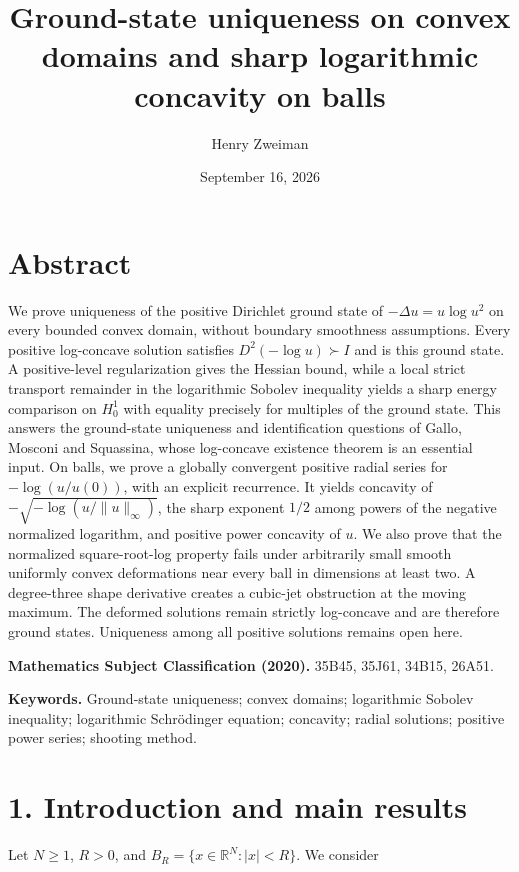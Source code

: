 \documentclass[11pt]{article}
\title{Ground-state uniqueness on convex domains and sharp logarithmic concavity on balls}
\author{Henry Zweiman}
\date{September 16, 2026}
\begin{document}
\maketitle
{}\section{Abstract}\label{abstract}

We prove uniqueness of the positive Dirichlet ground state of
\(-\Delta u=u\log u^2\) on every bounded convex domain, without boundary
smoothness assumptions. Every positive log-concave solution satisfies
\(D^2(-\log u)\succ I\) and is this ground state. A positive-level
regularization gives the Hessian bound, while a local strict transport
remainder in the logarithmic Sobolev inequality yields a sharp energy
comparison on \(H^1_0\) with equality precisely for multiples of the
ground state. This answers the ground-state uniqueness and
identification questions of Gallo, Mosconi and Squassina, whose
log-concave existence theorem is an essential input. On balls, we prove
a globally convergent positive radial series for \(-\log(u/u(0))\), with
an explicit recurrence. It yields concavity of
\(-\sqrt{-\log(u/\|u\|_\infty)}\), the sharp exponent \(1/2\) among
powers of the negative normalized logarithm, and positive power
concavity of \(u\). We also prove that the normalized square-root-log
property fails under arbitrarily small smooth uniformly convex
deformations near every ball in dimensions at least two. A degree-three
shape derivative creates a cubic-jet obstruction at the moving maximum.
The deformed solutions remain strictly log-concave and are therefore
ground states. Uniqueness among all positive solutions remains open
here.

\textbf{Mathematics Subject Classification (2020).} 35B45, 35J61, 34B15,
26A51.

\textbf{Keywords.} Ground-state uniqueness; convex domains; logarithmic
Sobolev inequality; logarithmic Schrödinger equation; concavity; radial
solutions; positive power series; shooting method.

\section{1. Introduction and main
results}\label{introduction-and-main-results}

Let \(N\geq1\), \(R>0\), and \(B_R=\{x\in\mathbb R^N:|x|<R\}\). We
consider
\end{document}
